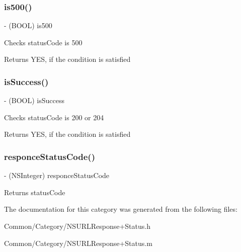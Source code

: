\subsubsection{\texorpdfstring{is500()}{is500()}}
{\footnotesize\ttfamily -\/ (B\+O\+OL) is500 \begin{DoxyParamCaption}{ }\end{DoxyParamCaption}}

Checks status\+Code is 500 \begin{DoxyReturn}{Returns}
Y\+ES, if the condition is satisfied 
\end{DoxyReturn}
\hypertarget{category_n_s_u_r_l_response_07_status_08_a69e713cc81bab91cccce25e2945cab9b}{}\label{category_n_s_u_r_l_response_07_status_08_a69e713cc81bab91cccce25e2945cab9b} 
\subsubsection{\texorpdfstring{is\+Success()}{isSuccess()}}
{\footnotesize\ttfamily -\/ (B\+O\+OL) is\+Success \begin{DoxyParamCaption}{ }\end{DoxyParamCaption}}

Checks status\+Code is 200 or 204 \begin{DoxyReturn}{Returns}
Y\+ES, if the condition is satisfied 
\end{DoxyReturn}
\hypertarget{category_n_s_u_r_l_response_07_status_08_a5819f93f5ac9ed26e060d4c3489ae9bc}{}\label{category_n_s_u_r_l_response_07_status_08_a5819f93f5ac9ed26e060d4c3489ae9bc} 
\subsubsection{\texorpdfstring{responce\+Status\+Code()}{responceStatusCode()}}
{\footnotesize\ttfamily -\/ (N\+S\+Integer) responce\+Status\+Code \begin{DoxyParamCaption}{ }\end{DoxyParamCaption}}

Returns status\+Code 

The documentation for this category was generated from the following files\+:\begin{DoxyCompactItemize}
\item 
Common/\+Category/N\+S\+U\+R\+L\+Response+\+Status.\+h\item 
Common/\+Category/N\+S\+U\+R\+L\+Response+\+Status.\+m\end{DoxyCompactItemize}
